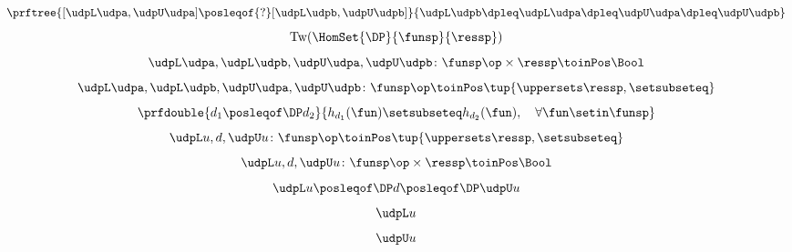 {\begin{forslides}
        \begin{equation}
            \label{eq:order_udp_1}
            \prftree{[\udpL\udpa,\udpU\udpa] \posleqof{?} [\udpL\udpb,\udpU\udpb]}{\udpL\udpb\dpleq\udpL\udpa\dpleq\udpU\udpa\dpleq\udpU\udpb}
        \end{equation}
        \begin{equation}
            \label{eq:order_udp_2}
            \text{Tw}(\HomSet{\DP}{\funsp}{\ressp})
        \end{equation}
        \begin{equation}
            \label{eq:order_udp_3}
            \udpL\udpa,\udpL\udpb,\udpU\udpa,\udpU\udpb\colon \funsp\op \times \ressp \toinPos \Bool
        \end{equation}
        \begin{equation}
            \label{eq:order_udp_4}
            \udpL\udpa,\udpL\udpb,\udpU\udpa,\udpU\udpb\colon \funsp\op \toinPos  \tup{\uppersets \ressp, \setsubseteq}
        \end{equation}
        \begin{equation}
            \label{eq:upos_dp_def_4}
            \prfdouble{
                d_1\posleqof\DP d_2
            }{
                h_{d_1}(\fun)\setsubseteq h_{d_2}(\fun), \quad \forall \fun \setin \funsp
            }
        \end{equation}
        \begin{equation}
            \label{eq:order_udp_5}
            \udpL u,d,\udpU u\colon \funsp\op \toinPos  \tup{\uppersets \ressp, \setsubseteq}
        \end{equation}
        \begin{equation}
            \label{eq:order_udp_6}
            \udpL u,d,\udpU u\colon  \funsp\op \times \ressp \toinPos \Bool
        \end{equation}
        \begin{equation}
            \label{eq:order_udp_7}
            \udpL u \posleqof\DP d \posleqof\DP \udpU u
        \end{equation}
        \begin{equation}
            \label{eq:order_udp_8}
            \udpL u
        \end{equation}
        \begin{equation}
            \label{eq:order_udp_9}
            \udpU u
        \end{equation}
        \begin{equation}
            \label{eq:order_udp_10}
            \begin{aligned}

\end{aligned}
\end{equation}
\end{forslides}}
